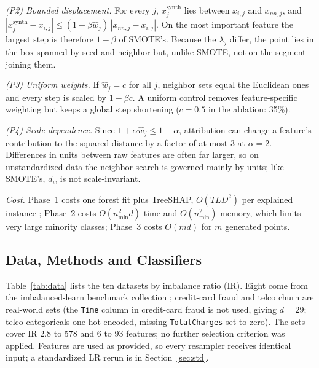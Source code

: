 \documentclass[conference,a4paper]{IEEEtran}
\begin{document}
\emph{(P2) Bounded displacement.} For every $j$, $x^{\mathrm{synth}}_j$ lies between $x_{i,j}$ and $x_{nn,j}$, and $|x^{\mathrm{synth}}_j-x_{i,j}|\le(1-\beta\hat{w}_j)\,|x_{nn,j}-x_{i,j}|$. On the most important feature the largest step is therefore $1-\beta$ of SMOTE's. Because the $\lambda_j$ differ, the point lies in the box spanned by seed and neighbor but, unlike SMOTE, not on the segment joining them.

\emph{(P3) Uniform weights.} If $\hat{w}_j=c$ for all $j$, neighbor sets equal the Euclidean ones and every step is scaled by $1-\beta c$. A uniform control removes feature-specific weighting but keeps a global step shortening ($c=0.5$ in the ablation: 35\%).

\emph{(P4) Scale dependence.} Since $1+\alpha\hat{w}_j\le 1+\alpha$, attribution can change a feature's contribution to the squared distance by a factor of at most 3 at $\alpha=2$. Differences in units between raw features are often far larger, so on unstandardized data the neighbor search is governed mainly by units; like SMOTE's, $d_w$ is not scale-invariant.

\textit{Cost.} Phase~1 costs one forest fit plus TreeSHAP, $O(TLD^2)$ per explained instance \cite{lundberg2020local}; Phase~2 costs $O(n_{\min}^2 d)$ time and $O(n_{\min}^2)$ memory, which limits very large minority classes; Phase~3 costs $O(md)$ for $m$ generated points.

\subsection{Data, Methods and Classifiers}\label{sec:setup}
Table~\ref{tab:data} lists the ten datasets by imbalance ratio (IR). Eight come from the imbalanced-learn benchmark collection \cite{lemaitre2017imbalanced}; credit-card fraud and telco churn are real-world sets (the \texttt{Time} column in credit-card fraud is not used, giving $d=29$; telco categoricals one-hot encoded, missing \texttt{TotalCharges} set to zero). The sets cover IR 2.8 to 578 and 6 to 93 features; no further selection criterion was applied. Features are used as provided, so every resampler receives identical input; a standardized LR rerun is in Section~\ref{sec:std}.
\end{document}
